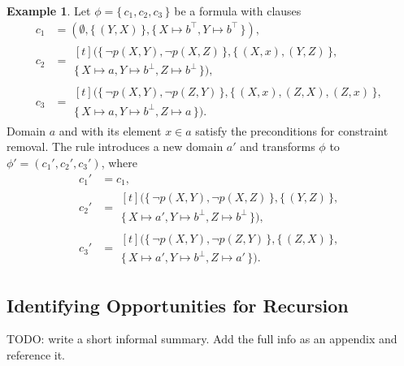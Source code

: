 \documentclass[letterpaper]{article} %
\theoremstyle{definition}
\newtheorem{example}{Example}
\theoremstyle{remark}
\begin{document}
\begin{example}
  Let $\phi = \{\, c_1, c_2, c_3 \,\}$ be a formula with clauses
  \begin{align*}
    c_1 &= (\emptyset, \{\, (Y, X) \,\}, \{\, X \mapsto b^\top, Y \mapsto b^\top \,\}), \\
    c_2 &=
          \begin{multlined}[t]
            (\{\, \neg p(X, Y), \neg p(X, Z) \,\}, \{\, (X, x), (Y, Z) \,\}, \\
            \{\, X \mapsto a, Y \mapsto b^\bot, Z \mapsto b^\bot \,\}),
          \end{multlined}\\
    c_3 &=
          \begin{multlined}[t]
            (\{\, \neg p(X, Y), \neg p(Z, Y) \,\}, \{\, (X, x), (Z, X), (Z, x) \,\}, \\
            \{\, X \mapsto a, Y \mapsto b^\bot, Z \mapsto a \,\}).
          \end{multlined}
  \end{align*}
  Domain $a$ and with its element $x \in a$ satisfy the preconditions for
  constraint removal. The rule introduces a new domain $a'$ and transforms
  $\phi$ to $\phi' = (c_1', c_2', c_3')$, where
  \begin{align*}
    c_1' &= c_1, \\
    c_2' &=
           \begin{multlined}[t]
             (\{\, \neg p(X, Y), \neg p(X, Z) \,\}, \{\, (Y, Z) \,\}, \\
             \{\, X \mapsto a', Y \mapsto b^\bot, Z \mapsto b^\bot \,\}),
           \end{multlined} \\
    c_3' &=
           \begin{multlined}[t]
             (\{\, \neg p(X, Y), \neg p(Z, Y) \,\}, \{\, (Z, X) \,\}, \\
             \{\, X \mapsto a', Y \mapsto b^\bot, Z \mapsto a' \,\}).
           \end{multlined}
  \end{align*}
\end{example}

\subsection{Identifying Opportunities for Recursion}\label{sec:ref}

TODO: write a short informal summary. Add the full info as an appendix and
reference it.
\end{document}
